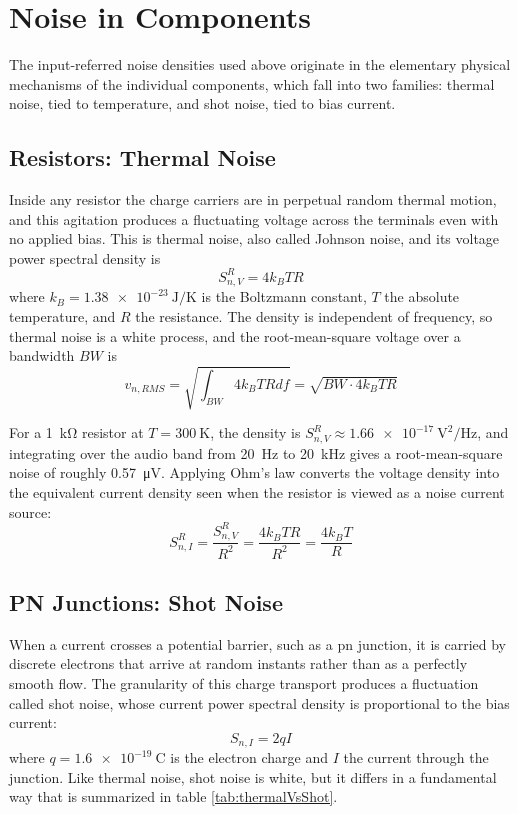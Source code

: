 \section{Noise in Components}
\label{sc:103}

The input-referred noise densities used above originate in the elementary physical mechanisms of the individual components, which fall into two families: thermal noise, tied to temperature, and shot noise, tied to bias current.

\subsection{Resistors: Thermal Noise}
\label{ssc:1031}

Inside any resistor the charge carriers are in perpetual random thermal motion, and this agitation produces a fluctuating voltage across the terminals even with no applied bias.
This is thermal noise, also called Johnson noise, and its voltage power spectral density is
\[
S_{n,V}^{R} = 4 k_B T R
\]
where \(k_B = \SI{1.38e-23}{\joule\per\kelvin}\) is the Boltzmann constant, \(T\) the absolute temperature, and \(R\) the resistance.
The density is independent of frequency, so thermal noise is a white process, and the root-mean-square voltage over a bandwidth \(BW\) is
\[
v_{n,RMS} = \sqrt{\int_{BW} 4 k_B T R df} = \sqrt{BW \cdot 4 k_B T R}
\]

For a \SI{1}{\kilo\ohm} resistor at \(T = \SI{300}{\kelvin}\), the density is \(S_{n,V}^{R} \approx \SI{1.66e-17}{\volt\squared\per\hertz}\), and integrating over the audio band from \SI{20}{\hertz} to \SI{20}{\kilo\hertz} gives a root-mean-square noise of roughly \SI{0.57}{\micro\volt}.
Applying Ohm's law converts the voltage density into the equivalent current density seen when the resistor is viewed as a noise current source:
\[
S_{n,I}^{R} = \frac{S_{n,V}^{R}}{R^2} = \frac{4 k_B T R}{R^2} = \frac{4 k_B T}{R}
\]

\subsection{PN Junctions: Shot Noise}
\label{ssc:1032}

When a current crosses a potential barrier, such as a pn junction, it is carried by discrete electrons that arrive at random instants rather than as a perfectly smooth flow.
The granularity of this charge transport produces a fluctuation called shot noise, whose current power spectral density is proportional to the bias current:
\[
S_{n,I} = 2 q I
\]
where \(q = \SI{1.6e-19}{\coulomb}\) is the electron charge and \(I\) the current through the junction.
Like thermal noise, shot noise is white, but it differs in a fundamental way that is summarized in table \ref{tab:thermalVsShot}.

